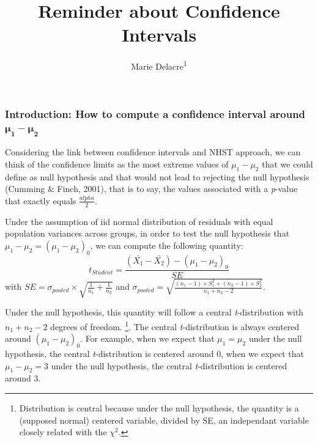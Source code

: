 \documentclass[
  english,
  man,floatsintext]{apa6}
\title{Reminder about Confidence Intervals}
\author{Marie Delacre\textsuperscript{1}}
\date{}
\affiliation{\vspace{0.5cm}\textsuperscript{1} ULB}
\begin{document}
\maketitle

\hypertarget{introduction-how-to-compute-a-confidence-interval-around-pmbmu_1-mu_2}{%
\subsubsection{\texorpdfstring{Introduction: How to compute a confidence interval around \(\pmb{\mu_1-\mu_2}\)}{Introduction: How to compute a confidence interval around \textbackslash pmb\{\textbackslash mu\_1-\textbackslash mu\_2\}}}\label{introduction-how-to-compute-a-confidence-interval-around-pmbmu_1-mu_2}}

Considering the link between confidence intervals and NHST approach, we can think of the confidence limits as the most extreme values of \(\mu_1-\mu_2\) that we could define as null hypothesis and that would not lead to rejecting the null hypothesis (Cumming \& Finch, 2001), that is to say, the values associated with a \emph{p}-value that exactly equals \(\frac{alpha}{2}\).

Under the assumption of iid normal distribution of residuals with equal population variances across groups, in order to test the null hypothesis that \(\mu_1-\mu_2= (\mu_1-\mu_2)_0\), we can compute the following quantity:
\begin{equation*} 
t_{Student}=\frac{(\bar{X_1}-\bar{X_2})-(\mu_1-\mu_2)_0}{SE}
\label{eq:tstudent}
\end{equation*}
with \(SE = \sigma_{pooled} \times \sqrt{\frac{1}{n_1}+\frac{1}{n_2}}\) and \(\sigma_{pooled} = \sqrt{\frac{(n_1-1) \times S^2_1+(n_2-1)\times S^2_2}{n_1+n_2-2}}\).

Under the null hypothesis, this quantity will follow a central \emph{t}-distribution with \(n_1+n_2-2\) degrees of freedom. \footnote{Distribution is central because under the null hypothesis, the quantity is a (supposed normal) centered variable, divided by SE, an independant variable closely related with the $\chi^2$. }. The central \emph{t}-distribution is always centered around \((\mu_1-\mu_2)_0\). For example, when we expect that \(\mu_1=\mu_2\) under the null hypothesis, the central \emph{t}-distribution is centered around 0, when we expect that \(\mu_1-\mu_2=3\) under the null hypothesis, the central \emph{t}-distribution is centered around 3.
\end{document}
